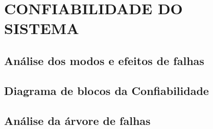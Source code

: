 \chapter{CONFIABILIDADE DO SISTEMA}
\label{chap:conf}

\section{Análise dos modos e efeitos de falhas}
\label{sec:fmeca}

\section{Diagrama de blocos da Confiabilidade}
\label{sec:diag}

\section{Análise da árvore de falhas}
\label{sec:fta}

